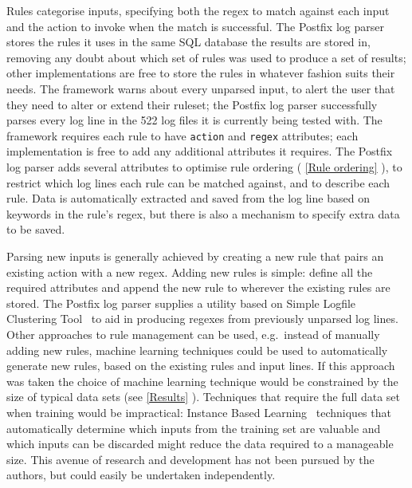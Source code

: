 \documentclass{svmult}
\newcommand{\sectionref}[1]{%
    \textsection{}\vref*{#1}%
}
\newcommand{\numberOFlogFILESall}[0]{%
    522%
}
\begin{document}
Rules categorise inputs, specifying both the regex to match against each
input and the action to invoke when the match is successful.  The Postfix
log parser stores the rules it uses in the same SQL database the results
are stored in, removing any doubt about which set of rules was used to
produce a set of results; other implementations are free to store the rules
in whatever fashion suits their needs.  The framework warns about every
unparsed input, to alert the user that they need to alter or extend their
ruleset; the Postfix log parser successfully parses every log line in the
\numberOFlogFILESall{} log files it is currently being tested with.  The
framework requires each rule to have \texttt{action} and \texttt{regex}
attributes; each implementation is free to add any additional attributes it
requires.  The Postfix log parser adds several attributes to optimise rule
ordering (\sectionref{Rule ordering}), to restrict which log lines each
rule can be matched against, and to describe each rule.  Data is
automatically extracted and saved from the log line based on keywords in
the rule's regex, but there is also a mechanism to specify extra data to be
saved.

Parsing new inputs is generally achieved by creating a new rule that pairs
an existing action with a new regex.  Adding new rules is simple: define
all the required attributes and append the new rule to wherever the
existing rules are stored.  The Postfix log parser supplies a utility based
on Simple Logfile Clustering Tool~\cite{slct-paper} to aid in producing
regexes from previously unparsed log lines.  Other approaches to rule
management can be used, e.g.\ instead of manually adding new rules, machine
learning techniques could be used to automatically generate new rules,
based on the existing rules and input lines.  If this approach was taken
the choice of machine learning technique would be constrained by the size
of typical data sets (see \sectionref{Results}).  Techniques that require
the full data set when training would be impractical: Instance Based
Learning~\cite{instance-based-learning} techniques that automatically
determine which inputs from the training set are valuable and which inputs
can be discarded might reduce the data required to a manageable size.  This
avenue of research and development has not been pursued by the authors, but
could easily be undertaken independently.
\end{document}
